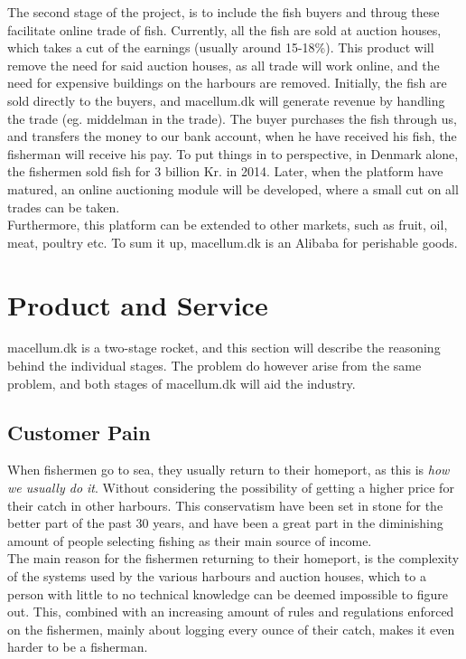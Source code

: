 \documentclass[12pt]{article}
\begin{document}
The second stage of the project, is to include the fish buyers and throug these facilitate online trade of fish. Currently, all the fish are sold at auction houses, which takes a cut of the earnings (usually around 15-18\%). This product will remove the need for said auction houses, as all trade will work online, and the need for expensive buildings on the harbours are removed. Initially, the fish are sold directly to the buyers, and macellum.dk will generate revenue by handling the trade (eg. middelman in the trade). The buyer purchases the fish through us, and transfers the money to our bank account, when he have received his fish, the fisherman will receive his pay. To put things in to perspective, in Denmark alone, the fishermen sold fish for 3 billion Kr. in 2014. Later, when the platform have matured, an online auctioning module will be developed, where a small cut on all trades can be taken.\\

Furthermore, this platform can be extended to other markets, such as fruit, oil, meat, poultry etc. To sum it up, macellum.dk is an Alibaba for perishable goods. 

\cleardoublepage
\section{Product and Service}
macellum.dk is a two-stage rocket, and this section will describe the reasoning behind the individual stages. The problem do however arise from the same problem, and both stages of macellum.dk will aid the industry.

\subsection{Customer Pain}
When fishermen go to sea, they usually return to their homeport, as this is \textit{how we usually do it}. Without considering the possibility of getting a higher price for their catch in other harbours. This conservatism have been set in stone for the better part of the past 30 years, and have been a great part in the diminishing amount of people selecting fishing as their main source of income.\\

The main reason for the fishermen returning to their homeport, is the complexity of the systems used by the various harbours and auction houses, which to a person with little to no technical knowledge can be deemed impossible to figure out. This, combined with an increasing amount of rules and regulations enforced on the fishermen, mainly about logging every ounce of their catch, makes it even harder to be a fisherman.\\
\end{document}
